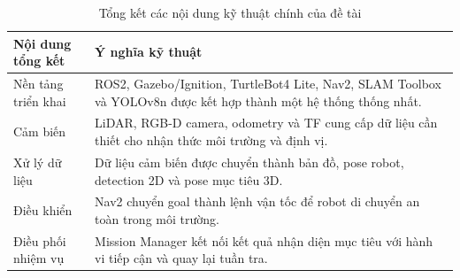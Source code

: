 \begin{table}[H]
    \centering
    \caption{Tổng kết các nội dung kỹ thuật chính của đề tài}
    \label{tab:technical-summary}
    \renewcommand{\arraystretch}{1.25}
    \small
    \begin{tabularx}{\textwidth}{|>{\raggedright\arraybackslash}p{}|>{\raggedright\arraybackslash}X|}
        \hline
        \textbf{Nội dung tổng kết} & \textbf{Ý nghĩa kỹ thuật} \\
        \hline
        Nền tảng triển khai & ROS2, Gazebo/Ignition, TurtleBot4 Lite, Nav2, SLAM Toolbox và YOLOv8n được kết hợp thành một hệ thống thống nhất. \\
        \hline
        Cảm biến & LiDAR, RGB-D camera, odometry và TF cung cấp dữ liệu cần thiết cho nhận thức môi trường và định vị. \\
        \hline
        Xử lý dữ liệu & Dữ liệu cảm biến được chuyển thành bản đồ, pose robot, detection 2D và pose mục tiêu 3D. \\
        \hline
        Điều khiển & Nav2 chuyển goal thành lệnh vận tốc để robot di chuyển an toàn trong môi trường. \\
        \hline
        Điều phối nhiệm vụ & Mission Manager kết nối kết quả nhận diện mục tiêu với hành vi tiếp cận và quay lại tuần tra. \\
        \hline
    \end{tabularx}
\end{table}

